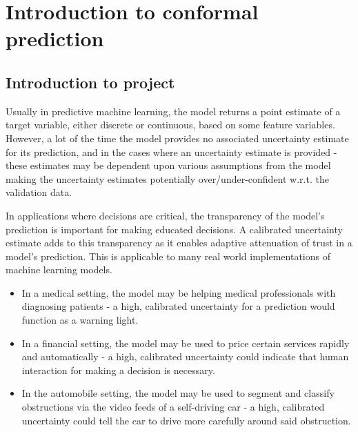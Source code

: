 
\chapter{Introduction to conformal prediction}

\section{Introduction to project}
Usually in predictive machine learning, the model returns a point estimate of a target variable, either discrete or continuous, based on some feature variables. However, a lot of the time the model provides no associated uncertainty estimate for its prediction, and in the cases where an uncertainty estimate is provided - these estimates may be dependent upon various assumptions from the model making the uncertainty estimates potentially over/under-confident w.r.t. the validation data. 

In applications where decisions are critical, the transparency of the model's prediction is important for making educated decisions. A calibrated uncertainty estimate adds to this transparency as it enables adaptive attenuation of trust in a model's prediction. This is applicable to many real world implementations of machine learning models. 
\begin{itemize}
    \item In a medical setting, the model may be helping medical professionals with diagnosing patients - a high, calibrated uncertainty for a prediction would function as a warning light.
    \item In a financial setting, the model may be used to price certain services rapidly and automatically - a high, calibrated uncertainty could indicate that human interaction for making a decision is necessary.
    \item In the automobile setting, the model may be used to segment and classify obstructions via the video feeds of a self-driving car - a high, calibrated uncertainty could tell the car to drive more carefully around said obstruction.
\end{itemize}

